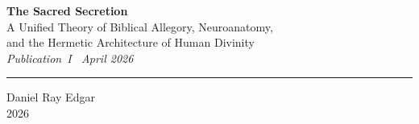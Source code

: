 \documentclass[12pt, a4paper]{article}
\begin{document}

\begin{titlepage}
  \centering
  \vspace*{2cm}

  {\LARGE\bfseries The Sacred Secretion}\\[0.8em]
  {\large A Unified Theory of Biblical Allegory, Neuroanatomy,\\
  and the Hermetic Architecture of Human Divinity}
  \\[0.6em]
  {\normalsize\itshape Publication~I \textbullet\ April 2026}

  \vspace{2cm}
  \rule{0.5\linewidth}{0.5pt}
  \vspace{2cm}

  \vspace{0.5cm}
  {\large Daniel Ray Edgar}\\[0.4em]
  {\normalsize 2026}

  \vfill


\end{titlepage}
\end{document}

